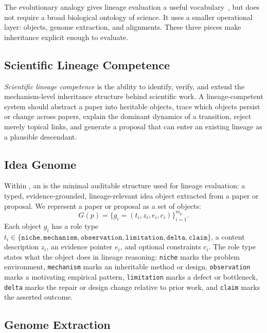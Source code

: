 The evolutionary analogy gives lineage evaluation a useful vocabulary~\citep{darwin1859}, but \igbench{} does not require a broad biological ontology of science. It uses a smaller operational layer: \genome{} objects, genome extraction, and \genomediff{} alignments. These three pieces make inheritance explicit enough to evaluate.

\subsection{Scientific Lineage Competence}
\label{sec:lineage_competence}

\emph{Scientific lineage competence} is the ability to identify, verify, and extend the mechanism-level inheritance structure behind scientific work. A lineage-competent system should abstract a paper into heritable \genome{} objects, trace which objects persist or change across papers, explain the dominant dynamics of a transition, reject merely topical links, and generate a proposal that can enter an existing lineage as a plausible descendant.

\subsection{Idea Genome}
\label{sec:formalism}

Within \ideagene{}, an \textbf{\genome{}} is the minimal auditable structure used for lineage evaluation: a typed, evidence-grounded, lineage-relevant idea object extracted from a paper or proposal. We represent a paper or proposal as a set of \genome{} objects:
\begin{equation}
G(p)=\{g_i=(t_i,z_i,e_i,c_i)\}_{i=1}^{m_p}.
\label{eq:idea-genome}
\end{equation}
Each \genome{} object $g_i$ has a role type $t_i \in \{\texttt{niche}, \texttt{mechanism}, \texttt{observation}, \texttt{limitation}, \texttt{delta}, \texttt{claim}\}$, a content description $z_i$, an evidence pointer $e_i$, and optional constraints $c_i$. The role type states what the object does in lineage reasoning: \texttt{niche} marks the problem environment, \texttt{mechanism} marks an inheritable method or design, \texttt{observation} marks a motivating empirical pattern, \texttt{limitation} marks a defect or bottleneck, \texttt{delta} marks the repair or design change relative to prior work, and \texttt{claim} marks the asserted outcome.

\subsection{Genome Extraction}
\label{sec:genome_extraction}

